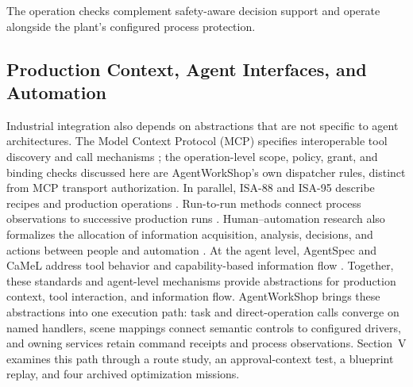 The operation checks complement safety-aware decision support
\cite{jiang2026agentic} and operate alongside the plant's configured process
protection.

\subsection{Production Context, Agent Interfaces, and Automation}
Industrial integration also depends on abstractions that are not specific to
agent architectures. The Model Context Protocol (MCP) specifies interoperable
tool discovery and call mechanisms \cite{mcp2024}; the operation-level scope,
policy, grant, and binding checks discussed here are AgentWorkShop's own
dispatcher rules, distinct from MCP transport authorization. In parallel,
ISA-88 and ISA-95 describe recipes and production operations
\cite{isa88_2010,isa95_2025}. Run-to-run methods connect process observations
to successive production runs \cite{moyne2000r2r}. Human--automation research
also formalizes the allocation of information acquisition, analysis, decisions,
and actions between people and automation \cite{parasuraman2000model}. At the
agent level, AgentSpec and CaMeL address tool behavior and capability-based
information flow \cite{wang2025agentspec,debenedetti2025camel}. Together, these standards
and agent-level mechanisms provide abstractions for production context, tool
interaction, and information flow. AgentWorkShop brings these abstractions into
one execution path: task and direct-operation calls converge on named handlers,
scene mappings connect semantic controls to configured drivers, and owning
services retain command receipts and process observations. Section~V examines
this path through a route study, an approval-context test, a blueprint replay,
and four archived optimization missions.
